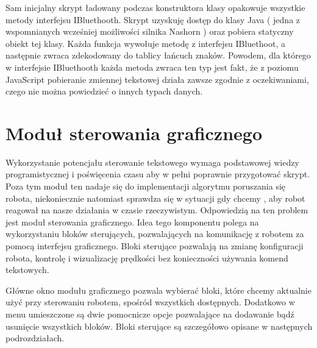 \documentclass[eng,printmode]{mgr}
\begin{document}
Sam inicjalny skrypt ładowany podczas konstruktora klasy opakowuje wszystkie metody interfejsu IBluethooth. Skrypt uzyskuję dostęp do klasy Java ( jedna z wspomnianych wcześniej możliwości silnika Nashorn ) oraz pobiera statyczny obiekt tej klasy. Każda funkcja wywołuje metodę z interfejsu  IBluethoot, a następnie zwraca zdekodowany do tablicy łańcuch znaków. Powodem, dla którego w interfejsie IBluethooth każda metoda zwraca ten typ jest fakt, że z poziomu JavaScript pobieranie zmiennej tekstowej działa zawsze zgodnie z oczekiwaniami, czego nie można powiedzieć o innych typach danych.

 \section{Moduł sterowania graficznego}

Wykorzystanie potencjału sterowanie tekstowego wymaga podstawowej wiedzy programistycznej i poświęcenia czasu aby w pełni poprawnie przygotować skrypt. Poza tym moduł ten nadaje się do implementacji algorytmu poruszania się robota, niekoniecznie natomiast sprawdza się w sytuacji gdy chcemy , aby robot reagował na nasze działania w czasie rzeczywistym. Odpowiedzią  na ten problem jest moduł sterowania graficznego. Idea tego komponentu polega na wykorzystaniu bloków sterujących, pozwalających na komunikację z robotem za pomocą interfejsu graficznego. Bloki sterujące pozwalają na zmianę konfiguracji robota, kontrolę  i wizualizację prędkości bez konieczności używania komend tekstowych. 

Główne okno modułu graficznego pozwala wybierać bloki, które chcemy aktualnie użyć przy sterowaniu robotem, spośród wszystkich dostępnych. Dodatkowo w menu umieszczone są dwie pomocnicze opcje pozwalające na dodawanie bądź usunięcie wszystkich bloków. Bloki sterujące są szczegółowo opisane w następnych podrozdziałach.
\end{document}
